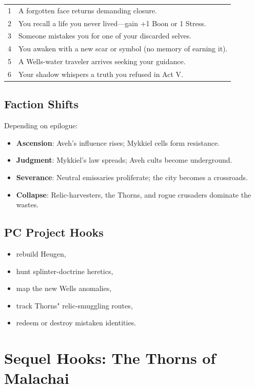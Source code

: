 \documentclass[11pt]{book}
\begin{document}
\begin{longtable}{c p{10cm}}
1 & A forgotten face returns demanding closure. \\
2 & You recall a life you never lived---gain +1 Boon or 1 Stress. \\
3 & Someone mistakes you for one of your discarded selves. \\
4 & You awaken with a new scar or symbol (no memory of earning it). \\
5 & A Wells-water traveler arrives seeking your guidance. \\
6 & Your shadow whispers a truth you refused in Act V. \\
\end{longtable}

\subsection{Faction Shifts}
Depending on epilogue:
\begin{itemize}[leftmargin=*]
    \item \textbf{Ascension}: Aveh's influence rises; Mykkiel cells form resistance.
    \item \textbf{Judgment}: Mykkiel's law spreads; Aveh cults become underground.
    \item \textbf{Severance}: Neutral emissaries proliferate; the city becomes a crossroads.
    \item \textbf{Collapse}: Relic-harvesters, the Thorns, and rogue crusaders dominate the wastes.
\end{itemize}

\subsection{PC Project Hooks}
\begin{itemize}
    \item rebuild Heugen,
    \item hunt splinter-doctrine heretics,
    \item map the new Wells anomalies,
    \item track Thorns" relic-smuggling routes,
    \item redeem or destroy mistaken identities.
\end{itemize}

\section{Sequel Hooks: The Thorns of Malachai}
\end{document}
